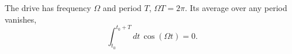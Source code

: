\documentclass{article}
\begin{document}
The drive has frequency $\Omega$ and period $T$, $\Omega T = 2\pi$. Its average over any period vanishes,
\begin{equation}
\int_{t_0}^{t_0+T} dt\, \cos(\Omega t) = 0 .
\label{eq:avg}
\end{equation}
\end{document}
